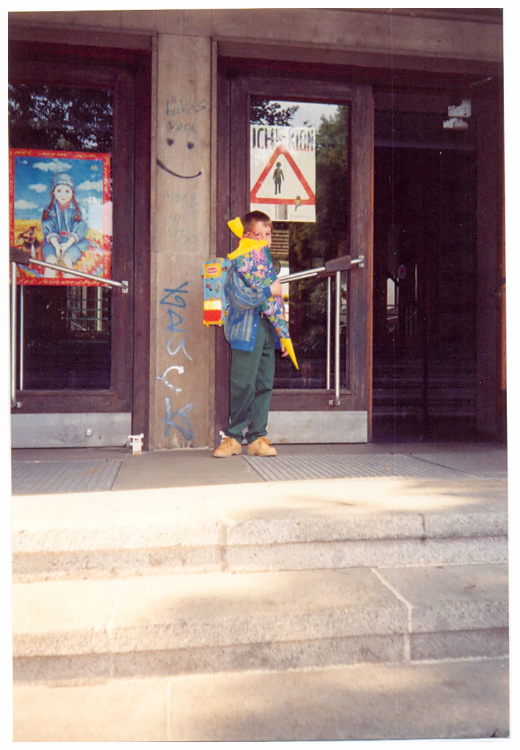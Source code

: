 \documentclass[aspectratio=169]{beamer}
\begin{document}
\begin{frame}[fragile]
\begin{minipage}{.65\textwidth}
    \end{minipage}%
    \begin{minipage}{.17\textwidth}
        \centering
        \includegraphics[width=1.0\textwidth]{images/0204.jpg}

\end{minipage}
\end{frame}
\end{document}
